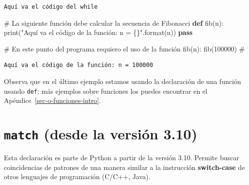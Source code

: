 \documentclass[
  spanish,
  letterpaper,
]{scrbook}
\newenvironment{Shaded}{\begin{snugshade}}{\end{snugshade}}
\newcommand{\BuiltInTok}[1]{\textcolor[rgb]{0.00,0.23,0.31}{#1}}
\newcommand{\CommentTok}[1]{\textcolor[rgb]{0.37,0.37,0.37}{#1}}
\newcommand{\ControlFlowTok}[1]{\textcolor[rgb]{0.00,0.23,0.31}{\textbf{#1}}}
\newcommand{\DecValTok}[1]{\textcolor[rgb]{0.68,0.00,0.00}{#1}}
\newcommand{\KeywordTok}[1]{\textcolor[rgb]{0.00,0.23,0.31}{\textbf{#1}}}
\newcommand{\NormalTok}[1]{\textcolor[rgb]{0.00,0.23,0.31}{#1}}
\newcommand{\SpecialCharTok}[1]{\textcolor[rgb]{0.37,0.37,0.37}{#1}}
\newcommand{\StringTok}[1]{\textcolor[rgb]{0.13,0.47,0.30}{#1}}
\theoremstyle{definition}
\theoremstyle{remark}
\begin{document}
\begin{verbatim}
Aquí va el código del while
\end{verbatim}

\begin{Shaded}
\begin{Highlighting}[]
\CommentTok{\# La siguiente función debe calcular la secuencia de Fibonacci}
\KeywordTok{def}\NormalTok{ fib(n):}
    \BuiltInTok{print}\NormalTok{(}\StringTok{"Aquí va el código de la función: n = }\SpecialCharTok{\{\}}\StringTok{"}\NormalTok{.}\BuiltInTok{format}\NormalTok{(n))}
    \ControlFlowTok{pass}

\CommentTok{\# En este punto del programa requiero el uso de la función fib(n):}
\NormalTok{fib(}\DecValTok{100000}\NormalTok{) }\CommentTok{\# }
\end{Highlighting}
\end{Shaded}

\begin{verbatim}
Aquí va el código de la función: n = 100000
\end{verbatim}

\begin{tcolorbox}[enhanced jigsaw, colframe=quarto-callout-note-color-frame, opacityback=0, toprule=.15mm, colback=white, coltitle=black, leftrule=.75mm, arc=.35mm, breakable, left=2mm, bottomtitle=1mm, rightrule=.15mm, bottomrule=.15mm, colbacktitle=quarto-callout-note-color!10!white, toptitle=1mm, titlerule=0mm, opacitybacktitle=0.6, title=\textcolor{quarto-callout-note-color}{\faInfo}\hspace{0.5em}{Nota.}]

Observa que en el último ejemplo estamos usando la declaración de una
función usando \texttt{def}; más ejemplos sobre funciones los puedes
encontrar en el Apéndice~\ref{sec-o-funciones-intro}.

\end{tcolorbox}

\section{\texorpdfstring{\texttt{match} (desde la versión
3.10)}{match (desde la versión 3.10)}}\label{match-desde-la-versiuxf3n-3.10}

Esta declaración es parte de Python a partir de la versión 3.10. Permite
buscar coincidencias de patrones de una manera similar a la instrucción
\textbf{switch-case} de otros lenguajes de programación (C/C++, Java).
\end{document}
